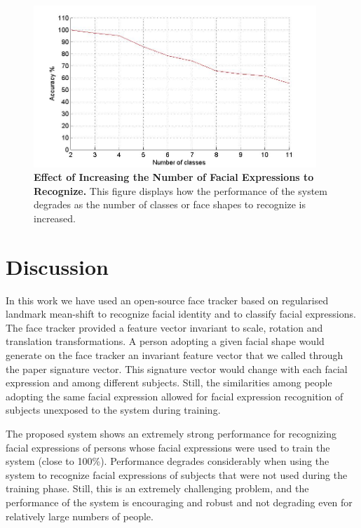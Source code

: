 \documentclass[]{article}
\begin{document}
\begin{figure}[ht]
\begin{center}
\vspace{-3mm}
\includegraphics[width=0.95\textwidth]{figures/50people_increasing_classes.jpg}
\end{center}
\caption{\textbf{Effect of Increasing the Number of Facial Expressions to Recognize.} This figure displays how the 
performance of the system degrades as the number of classes or face shapes to recognize is increased. }
\label{increasingNumberExpressions}
\end{figure}






\section{Discussion}
In this work we have used an open-source face tracker based on regularised landmark mean-shift to recognize facial
identity and to classify facial expressions. The face tracker provided a feature vector invariant to scale, rotation and
translation transformations. A person adopting a given facial shape would generate on the face tracker an invariant
feature vector that we called through the paper signature vector. This signature vector would change with each facial
expression  and among different subjects. Still, the similarities among people adopting the same facial expression 
allowed for facial expression recognition of subjects unexposed to the system during training.


The proposed system shows an extremely strong performance for recognizing facial expressions of persons whose facial
expressions were used to train the system (close to 100\%). Performance degrades
considerably when using the system to recognize facial expressions of subjects that were not used during the training phase. Still, this is an extremely
challenging problem, and the performance of the system is encouraging and robust and not degrading even for relatively
large numbers of people.
\end{document}
